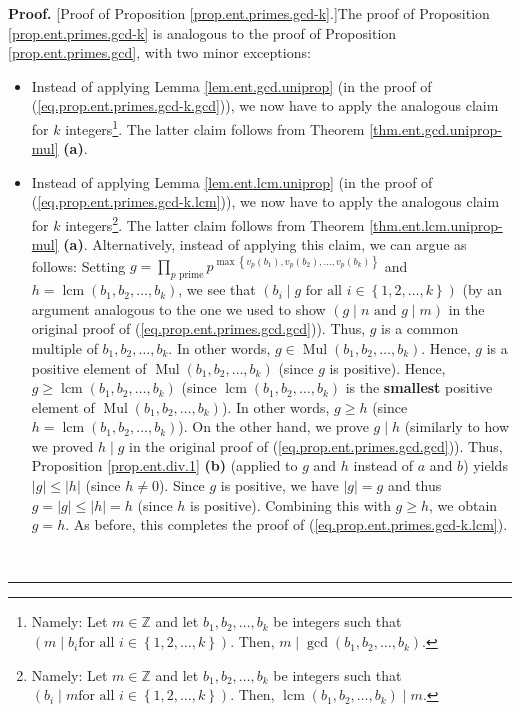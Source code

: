 \documentclass[numbers=enddot,12pt,final,onecolumn,notitlepage]{scrartcl}%
\numberwithin{exer}{subsection}
\theoremstyle{definition}
\newenvironment{proof}[1][Proof]{\noindent\textbf{#1.} }{\ \rule{0.5em}{0.5em}}
\let\prodnonlimits\prod
\renewcommand{\prod}{\prodnonlimits\limits}
\begin{document}
\begin{proof}
[Proof of Proposition \ref{prop.ent.primes.gcd-k}.]The proof of Proposition
\ref{prop.ent.primes.gcd-k} is analogous to the proof of Proposition
\ref{prop.ent.primes.gcd}, with two minor exceptions:

\begin{itemize}
\item Instead of applying Lemma \ref{lem.ent.gcd.uniprop} (in the proof of
(\ref{eq.prop.ent.primes.gcd-k.gcd})), we now have to apply the analogous
claim for $k$ integers\footnote{Namely: Let $m\in\mathbb{Z}$ and let
$b_{1},b_{2},\ldots,b_{k}$ be integers such that $\left(  m\mid b_{i}\text{
for all }i\in\left\{  1,2,\ldots,k\right\}  \right)  $. Then, $m\mid
\gcd\left(  b_{1},b_{2},\ldots,b_{k}\right)  $.}. The latter claim follows
from Theorem \ref{thm.ent.gcd.uniprop-mul} \textbf{(a)}.

\item Instead of applying Lemma \ref{lem.ent.lcm.uniprop} (in the proof of
(\ref{eq.prop.ent.primes.gcd-k.lcm})), we now have to apply the analogous
claim for $k$ integers\footnote{Namely: Let $m\in\mathbb{Z}$ and let
$b_{1},b_{2},\ldots,b_{k}$ be integers such that $\left(  b_{i}\mid m\text{
for all }i\in\left\{  1,2,\ldots,k\right\}  \right)  $. Then,
$\operatorname{lcm}\left(  b_{1},b_{2},\ldots,b_{k}\right)  \mid m$.}. The
latter claim follows from Theorem \ref{thm.ent.lcm.uniprop-mul} \textbf{(a)}.
Alternatively, instead of applying this claim, we can argue as follows:
Setting $g=\prod_{p\text{ prime}}p^{\max\left\{  v_{p}\left(  b_{1}\right)
,v_{p}\left(  b_{2}\right)  ,\ldots,v_{p}\left(  b_{k}\right)  \right\}  }$
and $h=\operatorname{lcm}\left(  b_{1},b_{2},\ldots,b_{k}\right)  $, we see
that $\left(  b_{i}\mid g\text{ for all }i\in\left\{  1,2,\ldots,k\right\}
\right)  $ (by an argument analogous to the one we used to show $\left(  g\mid
n\text{ and }g\mid m\right)  $ in the original proof of
(\ref{eq.prop.ent.primes.gcd.gcd})). Thus, $g$ is a common multiple of
$b_{1},b_{2},\ldots,b_{k}$. In other words, $g\in\operatorname*{Mul}\left(
b_{1},b_{2},\ldots,b_{k}\right)  $. Hence, $g$ is a positive element of
$\operatorname*{Mul}\left(  b_{1},b_{2},\ldots,b_{k}\right)  $ (since $g$ is
positive). Hence, $g\geq\operatorname{lcm}\left(  b_{1},b_{2},\ldots
,b_{k}\right)  $ (since $\operatorname{lcm}\left(  b_{1},b_{2},\ldots
,b_{k}\right)  $ is the \textbf{smallest} positive element of
$\operatorname*{Mul}\left(  b_{1},b_{2},\ldots,b_{k}\right)  $). In other
words, $g\geq h$ (since $h=\operatorname{lcm}\left(  b_{1},b_{2},\ldots
,b_{k}\right)  $). On the other hand, we prove $g\mid h$ (similarly to how we
proved $h\mid g$ in the original proof of (\ref{eq.prop.ent.primes.gcd.gcd})).
Thus, Proposition \ref{prop.ent.div.1} \textbf{(b)} (applied to $g$ and $h$
instead of $a$ and $b$) yields $\left\vert g\right\vert \leq\left\vert
h\right\vert $ (since $h\neq0$). Since $g$ is positive, we have $\left\vert
g\right\vert =g$ and thus $g=\left\vert g\right\vert \leq\left\vert
h\right\vert =h$ (since $h$ is positive). Combining this with $g\geq h$, we
obtain $g=h$. As before, this completes the proof of
(\ref{eq.prop.ent.primes.gcd-k.lcm}).
\end{itemize}
\end{proof}
\end{document}
